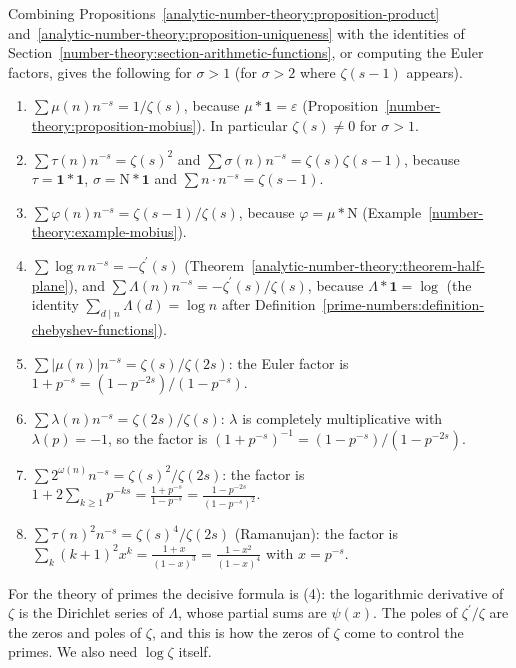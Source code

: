\begin{example}\label{analytic-number-theory:example-dirichlet-series-table}
Combining Propositions~\ref{analytic-number-theory:proposition-product} and~\ref{analytic-number-theory:proposition-uniqueness} with the identities of
Section~\ref{number-theory:section-arithmetic-functions}, or computing the Euler factors, gives the following for $\sigma > 1$ (for $\sigma > 2$ where $\zeta(s - 1)$ appears).
\begin{enumerate}
\item $\sum\mu(n)n^{-s} = 1/\zeta(s)$, because $\mu * \mathbf{1} = \varepsilon$ (Proposition~\ref{number-theory:proposition-mobius}). In particular $\zeta(s) \neq 0$ for $\sigma > 1$.
\item $\sum\tau(n)n^{-s} = \zeta(s)^2$ and $\sum\sigma(n)n^{-s} = \zeta(s)\zeta(s - 1)$, because $\tau = \mathbf{1} * \mathbf{1}$, $\sigma = \mathrm{N} * \mathbf{1}$ and $\sum n\cdot n^{-s} = \zeta(s - 1)$.
\item $\sum\varphi(n)n^{-s} = \zeta(s - 1)/\zeta(s)$, because $\varphi = \mu * \mathrm{N}$ (Example~\ref{number-theory:example-mobius}).
\item $\sum\log n\,n^{-s} = -\zeta^{\prime}(s)$ (Theorem~\ref{analytic-number-theory:theorem-half-plane}), and $\sum\Lambda(n)n^{-s} = -\zeta^{\prime}(s)/\zeta(s)$, because $\Lambda * \mathbf{1} = \log$
(the identity $\sum_{d \mid n}\Lambda(d) = \log n$ after Definition~\ref{prime-numbers:definition-chebyshev-functions}).
\item $\sum|\mu(n)|n^{-s} = \zeta(s)/\zeta(2s)$: the Euler factor is $1 + p^{-s} = (1 - p^{-2s})/(1 - p^{-s})$.
\item $\sum\lambda(n)n^{-s} = \zeta(2s)/\zeta(s)$: $\lambda$ is completely multiplicative with $\lambda(p) = -1$, so the factor is $(1 + p^{-s})^{-1} = (1 - p^{-s})/(1 - p^{-2s})$.
\item $\sum2^{\omega(n)}n^{-s} = \zeta(s)^2/\zeta(2s)$: the factor is $1 + 2\sum_{k \geq 1}p^{-ks} = \frac{1 + p^{-s}}{1 - p^{-s}} = \frac{1 - p^{-2s}}{(1 - p^{-s})^2}$.
\item $\sum\tau(n)^2n^{-s} = \zeta(s)^4/\zeta(2s)$ (Ramanujan): the factor is $\sum_k(k + 1)^2x^k = \frac{1 + x}{(1 - x)^3} = \frac{1 - x^2}{(1 - x)^4}$ with $x = p^{-s}$.
\end{enumerate}
\end{example}

For the theory of primes the decisive formula is (4): the logarithmic derivative of $\zeta$ is the Dirichlet series of $\Lambda$, whose partial sums are $\psi(x)$. The poles of $\zeta^{\prime}/\zeta$
are the zeros and poles of $\zeta$, and this is how the zeros of $\zeta$ come to control the primes. We also need $\log\zeta$ itself.

